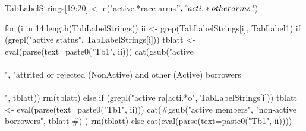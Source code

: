 \begin{Schunk}
\begin{Sinput}
TabLabelStrings[19:20] <- c("active.*race arms$", "acti.*other arms$")
\end{Sinput}
\end{Schunk}
\begin{Sinput}
for (i in 14:length(TabLabelStrings)) {
  ii <- grep(TabLabelStrings[i], TabLabel1)
  if (grepl("active status", TabLabelStrings[i])){
   tblatt <- eval(parse(text=paste0("Tb1", ii)))
   cat(gsub("active\\\\", "attrited or rejected (NonActive) and other (Active) borrowers\\\\", 
     tblatt)) 
   rm(tblatt)
  } else
  if (grepl("active ra|acti.*o", TabLabelStrings[i])) {
   tblatt <- eval(parse(text=paste0("Tb1", ii)))
   cat(#gsub("active members", "non-active borrowers", 
     tblatt
     #)
     ) 
    rm(tblatt)
  } else
   cat(eval(parse(text=paste0("Tb1", ii))))
}
\end{Sinput}
